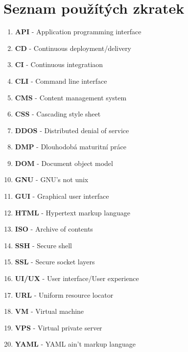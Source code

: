 \documentclass[12pt,a4paper]{report}
\begin{document}
  \section{Seznam použítých zkratek}
  \begin{enumerate}
    \item \textbf{API} - Application programming interface
    \item \textbf{CD} - Continuous deployment/delivery
    \item \textbf{CI} - Continuous integratiaon
    \item \textbf{CLI} - Command line interface
    \item \textbf{CMS} - Content management system
    \item \textbf{CSS} - Cascading style sheet
    \item \textbf{DDOS} - Distributed denial of service
    \item \textbf{DMP} - Dlouhodobá maturitní práce
    \item \textbf{DOM} - Document object model
    \item \textbf{GNU} - GNU's not unix
    \item \textbf{GUI} - Graphical user interface
    \item \textbf{HTML} - Hypertext markup language
    \item \textbf{ISO} - Archive of contents
    \item \textbf{SSH} - Secure shell
    \item \textbf{SSL}  - Secure socket layers
    \item \textbf{UI/UX} - User interface/User experience
    \item \textbf{URL} - Uniform resource locator
    \item \textbf{VM} - Virtual machine
    \item \textbf{VPS} - Virtual private server
    \item \textbf{YAML} - YAML ain't markup language
  
  \end{enumerate}

  
\end{document}

